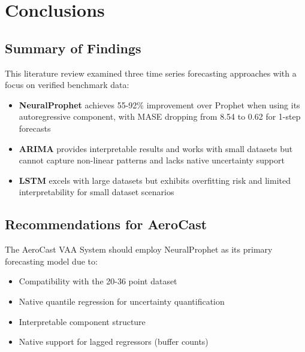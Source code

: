 \documentclass[12pt,a4paper]{article}
\begin{document}

\section{Conclusions}

\subsection{Summary of Findings}

This literature review examined three time series forecasting approaches with a focus on verified benchmark data:

\begin{itemize}
    \item \textbf{NeuralProphet} achieves 55-92\% improvement over Prophet when using its autoregressive component, with MASE dropping from 8.54 to 0.62 for 1-step forecasts \cite{tribe2021neuralprophet}
    \item \textbf{ARIMA} provides interpretable results and works with small datasets but cannot capture non-linear patterns and lacks native uncertainty support
    \item \textbf{LSTM} excels with large datasets but exhibits overfitting risk and limited interpretability for small dataset scenarios
\end{itemize}

\subsection{Recommendations for AeroCast}

The AeroCast VAA System should employ NeuralProphet as its primary forecasting model due to:

\begin{itemize}
    \item Compatibility with the 20-36 point dataset
    \item Native quantile regression for uncertainty quantification
    \item Interpretable component structure
    \item Native support for lagged regressors (buffer counts)
\end{itemize}

\end{document}
